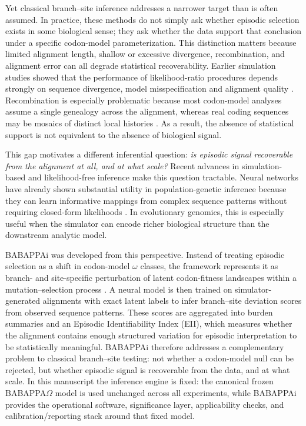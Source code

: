\documentclass[11pt]{article}
\begin{document}
Yet classical branch--site inference addresses a narrower target than is often assumed. In practice, these methods do not simply ask whether episodic selection exists in some biological sense; they ask whether the data support that conclusion under a specific codon-model parameterization. This distinction matters because limited alignment length, shallow or excessive divergence, recombination, and alignment error can all degrade statistical recoverability. Earlier simulation studies showed that the performance of likelihood-ratio procedures depends strongly on sequence divergence, model misspecification and alignment quality \cite{Anisimova2001,Wong2004,FletcherYang2010,JordanGoldman2012}. Recombination is especially problematic because most codon-model analyses assume a single genealogy across the alignment, whereas real coding sequences may be mosaics of distinct local histories \cite{Anisimova2003}. As a result, the absence of statistical support is not equivalent to the absence of biological signal.

This gap motivates a different inferential question: \emph{is episodic signal recoverable from the alignment at all, and at what scale?} Recent advances in simulation-based and likelihood-free inference make this question tractable. Neural networks have already shown substantial utility in population-genetic inference because they can learn informative mappings from complex sequence patterns without requiring closed-form likelihoods \cite{SheehanSong2016,Flagel2019,Cranmer2020}. In evolutionary genomics, this is especially useful when the simulator can encode richer biological structure than the downstream analytic model.

BABAPPAi was developed from this perspective. Instead of treating episodic selection as a shift in codon-model $\omega$ classes, the framework represents it as branch- and site-specific perturbation of latent codon-fitness landscapes within a mutation--selection process \cite{HalpernBruno1998}. A neural model is then trained on simulator-generated alignments with exact latent labels to infer branch--site deviation scores from observed sequence patterns. These scores are aggregated into burden summaries and an Episodic Identifiability Index (EII), which measures whether the alignment contains enough structured variation for episodic interpretation to be statistically meaningful. BABAPPAi therefore addresses a complementary problem to classical branch--site testing: not whether a codon-model null can be rejected, but whether episodic signal is recoverable from the data, and at what scale. In this manuscript the inference engine is fixed: the canonical frozen BABAPPA$\Omega$ model is used unchanged across all experiments, while BABAPPAi provides the operational software, significance layer, applicability checks, and calibration/reporting stack around that fixed model.
\end{document}
